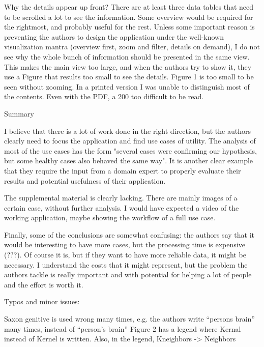     Why the details appear up front? There are at least three data tables that need to
    be scrolled a lot to see the information. Some overview would be required for the
    rightmost, and probably useful for the rest. Unless some important reason is
    preventing the authors to design the application under the well-known
    visualization mantra (overview first, zoom and filter, details on demand), I do
    not see why the whole bunch of information should be presented in the same view.
    This makes the main view too large, and when the authors try to show it, they use
    a Figure that results too small to see the details. Figure 1 is too small to be
    seen without zooming. In a printed version I was unable to distinguish most of the
    contents. Even with the PDF, a 200%
    too difficult to be read.


    Summary

    I believe that there is a lot of work done in the right direction, but the authors
    clearly need to focus the application and find use cases of utility. The analysis
    of most of the use cases has the form "several cases were confirming our
    hypothesis, but some healthy cases also behaved the same way". It is another clear
    example that they require the input from a domain expert to properly evaluate
    their results and potential usefulness of their application.

    The supplemental material is clearly lacking. There are mainly images of a certain
    case, without further analysis. I would have expected a video of the working
    application, maybe showing the workflow of a full use case.

    Finally, some of the conclusions are somewhat confusing: the authors say that it
    would be interesting to have more cases, but the processing time is expensive
    (???). Of course it is, but if they want to have more reliable data, it might be
    necessary. I understand the costs that it might represent, but the problem the
    authors tackle is really important and with potential for helping a lot of people
    and the effort is worth it.



    Typos and minor issues:

    Saxon genitive is used wrong many times, e.g. the authors write “persons brain”
    many times, instead of “person’s brain”
    Figure 2 has a legend where Kernal instead of Kernel is written.
    Also, in the legend, Kneighbors -> Neighbors

